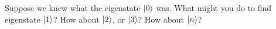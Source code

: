 \begin{questions}
\begin{parts}
					\begin{solution}[3in]
					\end{solution}
			
			\end{parts}
			
		\question Suppose we knew what the eigenstate $\ket{0}$ was.  What might you do to find eigenstate $\ket{1}$?  How about $\ket{2}$, or $\ket{3}$?  How about $\ket{n}$?
		
			
			\begin{solution}[2in]
			\end{solution}
			
	\end{questions}
	
	\stophere